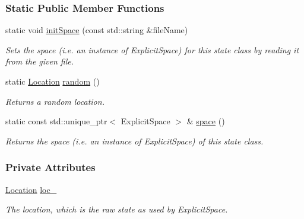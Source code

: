 \subsubsection*{Static Public Member Functions}
\begin{DoxyCompactItemize}
\item 
static void \hyperlink{structExplicitState_a3718782a0b046ef02964301159add81a}{init\+Space} (const std\+::string \&file\+Name)
\begin{DoxyCompactList}\small\item\em Sets the space (i.\+e. an instance of Explicit\+Space) for this state class by reading it from the given file. \end{DoxyCompactList}\item 
static \hyperlink{structExplicitState_a3801fbf90c7e687071c21a05de368748}{Location} \hyperlink{structExplicitState_abc7ecb5cdcb4c6295c16d4c537d561a3}{random} ()
\begin{DoxyCompactList}\small\item\em Returns a random location. \end{DoxyCompactList}\item 
static const std\+::unique\+\_\+ptr$<$ Explicit\+Space $>$ \& \hyperlink{structExplicitState_ad41fa646ddd6b7d55b2cf8b07e0d3dc2}{space} ()
\begin{DoxyCompactList}\small\item\em Returns the space (i.\+e. an instance of Explicit\+Space) of this state class. \end{DoxyCompactList}\end{DoxyCompactItemize}
\subsubsection*{Private Attributes}
\begin{DoxyCompactItemize}
\item 
\hyperlink{structExplicitState_a3801fbf90c7e687071c21a05de368748}{Location} \hyperlink{structExplicitState_a69a17ec02d10accbda79fb9f6675efa8}{loc\+\_\+}\hypertarget{structExplicitState_a69a17ec02d10accbda79fb9f6675efa8}{}\label{structExplicitState_a69a17ec02d10accbda79fb9f6675efa8}

\begin{DoxyCompactList}\small\item\em The location, which is the raw state as used by {\ttfamily Explicit\+Space}. \end{DoxyCompactList}\end{DoxyCompactItemize}
